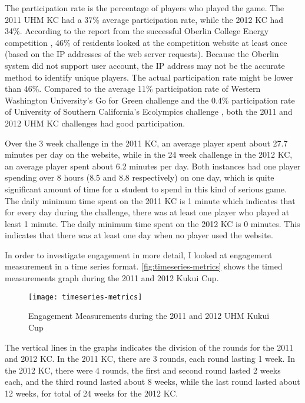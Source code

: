 The participation rate is the percentage of players who played the game. The 2011 UHM KC had a 37\% average participation rate, while the 2012 KC had 34\%. According to the report from the successful Oberlin College Energy competition \cite{petersen-dorm-energy-reduction}, 46\% of residents looked at the competition website at least once (based on the IP addresses of the web server requests). Because the Oberlin system did not support user account, the IP address may not be the accurate method to identify unique players. The actual participation rate might be lower than 46\%. Compared to the average 11\% participation rate of Western Washington University's Go for Green challenge \cite{Mauney-thesis} and the 0.4\% participation rate of University of Southern California's Ecolympics challenge \cite{Sintov2011}, both the 2011 and 2012 UHM KC challenges had good participation. 

Over the 3 week challenge in the 2011 KC, an average player spent about 27.7 minutes per day on the website, while in the 24 week challenge in the 2012 KC, an average player spent about 6.2 minutes per day. Both instances had one player spending over 8 hours (8.5 and 8.8 respectively) on one day, which is quite significant amount of time for a student to spend in this kind of serious game. The daily minimum time spent on the 2011 KC is 1 minute which indicates that for every day during the challenge, there was at least one player who played at least 1 minute. The daily minimum time spent on the 2012 KC is 0 minutes. This indicates that there was at least one day when no player used the website.

In order to investigate engagement in more detail, I looked at engagement measurement in a time series format. \autoref{fig:timeseries-metrics} shows the timed measurements graph during the 2011 and 2012 Kukui Cup.

\begin{figure}[ht!]
  \center
  \texttt{[image: timeseries-metrics]}
  \caption{Engagement Measurements during the 2011 and 2012 UHM Kukui Cup}
  \label{fig:timeseries-metrics}
\end{figure}

The vertical lines in the graphs indicates the division of the rounds for the 2011 and 2012 KC. In the 2011 KC, there are 3 rounds, each round lasting 1 week. In the 2012 KC, there were 4 rounds, the first and second round lasted 2 weeks each, and the third round lasted about 8 weeks, while the last round lasted about 12 weeks, for total of 24 weeks for the 2012 KC. 

